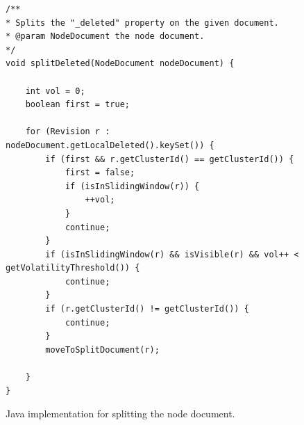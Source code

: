 \documentclass[abstracton,12pt]{scrartcl}
\theoremstyle{definition}
\begin{document}
\begin{figure}
    \begin{framed}
        \begin{scriptsize}
            \begin{verbatim}
/**
* Splits the "_deleted" property on the given document.
* @param NodeDocument the node document.
*/
void splitDeleted(NodeDocument nodeDocument) {

    int vol = 0;
    boolean first = true;

    for (Revision r : nodeDocument.getLocalDeleted().keySet()) {
        if (first && r.getClusterId() == getClusterId()) {
            first = false;
            if (isInSlidingWindow(r)) {
                ++vol;
            }
            continue;
        }
        if (isInSlidingWindow(r) && isVisible(r) && vol++ < getVolatilityThreshold()) {
            continue;
        }
        if (r.getClusterId() != getClusterId()) {
            continue;
        }
        moveToSplitDocument(r);

    }
}
            \end{verbatim}
        \end{scriptsize}
    \end{framed}
    \caption{Java implementation for splitting the node document.}
    \label{fig:split_document}
\end{figure}
\end{document}
